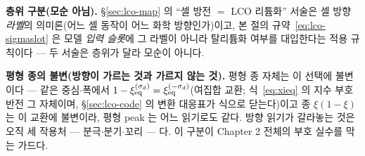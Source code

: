 \textbf{층위 구분(모순 아님).} \S\ref{sec:lco-map} 의 ``셀 방전 $=$ LCO 리튬화'' 서술은 셀 방향
\emph{라벨}의 의미론(어느 셀 동작이 어느 화학 방향인가)이고, 본 절의 규약~\eqref{eq:lco-sigmaslot} 은 모델
\emph{입력 슬롯}에 그 라벨이 아니라 탈리튬화 여부를 대입한다는 적용 규칙이다 --- 두 서술은 층위가 달라 모순이
아니다.

\textbf{평형 종의 불변(방향이 가르는 것과 가르지 않는 것).} 평형 종 자체는 이 선택에 불변이다 --- 같은
중심$\cdot$폭에서 $1-\xi_{\mathrm{eq}}^{(\sigma_d)}=\xi_{\mathrm{eq}}^{(-\sigma_d)}$(여집합 교환; 식~\eqref{eq:xieq} 의 지수
부호 반전 그 자체이며, \S\ref{sec:lco-code} 의 변환 대응표가 식으로 닫는다)이고 종 $\xi(1-\xi)$ 는 이 교환에
불변이라, 평형 peak 는 어느 읽기로도 같다. 방향 읽기가 갈라놓는 것은 오직 세 작용처 ---
분극$\cdot$분기$\cdot$꼬리 --- 다. 이 구분이 Chapter 2 전체의 부호 실수를 막는 가드다.

